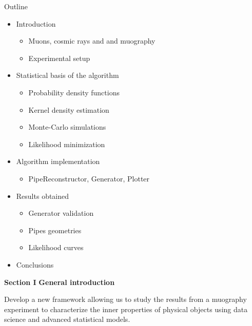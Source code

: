 \documentclass[8 pt]{beamer}
\begin{document}
\begin{frame}{Outline}

	\begin{itemize}
		\item Introduction
		\begin{itemize}
			\item Muons, cosmic rays and and muography
			\item Experimental setup
		\end{itemize} \vfill
		\item Statistical basis of the algorithm
		\begin{itemize}
			\item Probability density functions
			\item Kernel density estimation
			\item Monte-Carlo simulations
			\item Likelihood minimization
		\end{itemize} \vfill
		\item Algorithm implementation
		\begin{itemize}
			\item PipeReconstructor, Generator, Plotter
		\end{itemize} \vfill
		\item Results obtained
		\begin{itemize}
			\item Generator validation
			\item Pipes geometries
			\item Likelihood curves
		\end{itemize} \vfill
		\item Conclusions \vfill
	\end{itemize}

\end{frame}






\begin{frame}{}
	\centering
	\huge{\textbf{\color{mycolor} Section I}} \newline
	\LARGE{\textbf{\color{mycolor} General introduction \color{black}}} \vfill
	
	\LARGE{\textbf{\color{black} \color{black}}}\newline \vspace{10pt} \Large{Develop a new framework allowing us to study the results from a muography experiment to characterize the inner properties of physical objects using data science and advanced statistical models.} \vfill
\end{frame}
\end{document}
